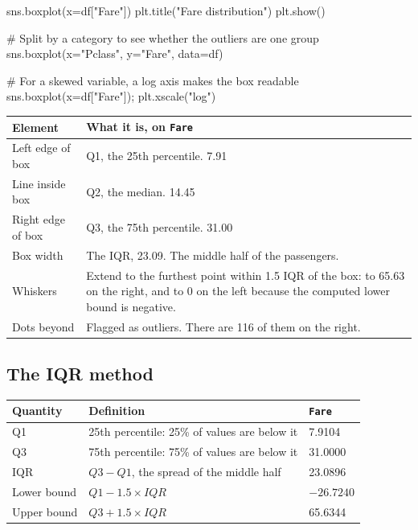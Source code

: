 \documentclass[11pt,a4paper]{article}
\begin{document}
\begin{py}
sns.boxplot(x=df["Fare"])
plt.title("Fare distribution")
plt.show()

# Split by a category to see whether the outliers are one group
sns.boxplot(x="Pclass", y="Fare", data=df)

# For a skewed variable, a log axis makes the box readable
sns.boxplot(x=df["Fare"]); plt.xscale("log")
\end{py}

\begin{tabularx}{\textwidth}{@{}l X@{}}
\toprule
\rowcolor{tablehead} \textbf{Element} & \textbf{What it is, on \texttt{Fare}} \\
\midrule
Left edge of box & Q1, the 25th percentile. 7.91 \\
Line inside box & Q2, the median. 14.45 \\
Right edge of box & Q3, the 75th percentile. 31.00 \\
Box width & The IQR, 23.09. The middle half of the passengers. \\
Whiskers & Extend to the furthest point within 1.5 IQR of the box: to 65.63 on the right, and to 0 on the left because the computed lower bound is negative. \\
Dots beyond & Flagged as outliers. There are 116 of them on the right. \\
\bottomrule
\end{tabularx}


\subsection{The IQR method}


\begin{tabularx}{\textwidth}{@{}l X l@{}}
\toprule
\rowcolor{tablehead} \textbf{Quantity} & \textbf{Definition} & \textbf{\texttt{Fare}} \\
\midrule
Q1 & 25th percentile: 25\% of values are below it & 7.9104 \\
Q3 & 75th percentile: 75\% of values are below it & 31.0000 \\
IQR & $Q3 - Q1$, the spread of the middle half & 23.0896 \\
Lower bound & $Q1 - 1.5 \times IQR$ & $-26.7240$ \\
Upper bound & $Q3 + 1.5 \times IQR$ & 65.6344 \\
\bottomrule
\end{tabularx}
\end{document}
